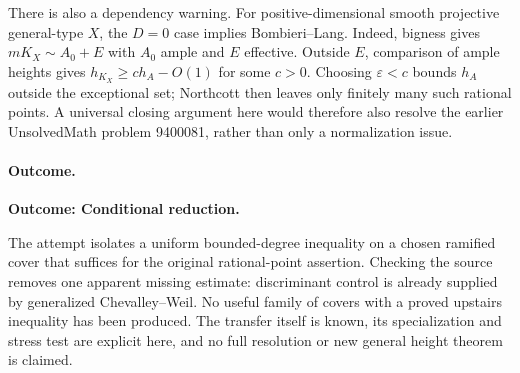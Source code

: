 \documentclass[11pt,a4paper]{article}
\newcommand{\eps}{\varepsilon}
\numberwithin{equation}{section}
\begin{document}
There is also a dependency warning. For positive-dimensional smooth projective general-type $X$, the $D=0$ case implies Bombieri--Lang. Indeed, bigness gives $mK_X\sim A_0+E$ with $A_0$ ample and $E$ effective. Outside $E$, comparison of ample heights gives $h_{K_X}\ge c h_A-O(1)$ for some $c>0$. Choosing $\eps<c$ bounds $h_A$ outside the exceptional set; Northcott then leaves only finitely many such rational points. A universal closing argument here would therefore also resolve the earlier UnsolvedMath problem 9400081, rather than only a normalization issue.

\paragraph{Outcome.}
\textbf{Outcome: Conditional reduction.}

The attempt isolates a uniform bounded-degree inequality on a chosen ramified cover that suffices for the original rational-point assertion. Checking the source removes one apparent missing estimate: discriminant control is already supplied by generalized Chevalley--Weil. No useful family of covers with a proved upstairs inequality has been produced. The transfer itself is known, its specialization and stress test are explicit here, and no full resolution or new general height theorem is claimed.

\end{document}
